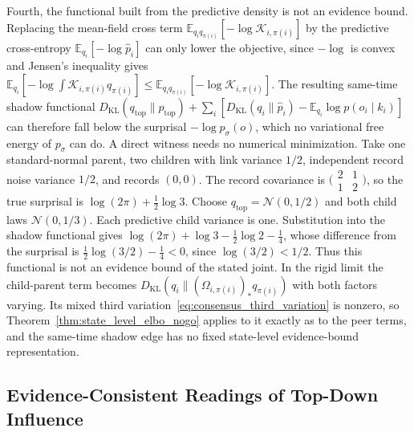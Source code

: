 \begin{remark}
Fourth, the functional built from the predictive density is not an evidence bound. Replacing the mean-field cross term $\mathbb{E}_{q_i q_{\pi(i)}}[-\log \mathcal{K}_{i,\pi(i)}]$ by the predictive cross-entropy $\mathbb{E}_{q_i}[-\log \hat{p}_i]$ can only lower the objective, since $-\log$ is convex and Jensen's inequality gives $\mathbb{E}_{q_i}[-\log \int \mathcal{K}_{i,\pi(i)} q_{\pi(i)}] \le \mathbb{E}_{q_i q_{\pi(i)}}[-\log \mathcal{K}_{i,\pi(i)}]$. The resulting same-time shadow functional $D_{\mathrm{KL}}(q_{\mathrm{top}}\|p_{\mathrm{top}}) + \sum_i [D_{\mathrm{KL}}(q_i\|\hat{p}_i) - \mathbb{E}_{q_i}\log p(o_i \mid k_i)]$ can therefore fall below the surprisal $-\log p_\sigma(o)$, which no variational free energy of $p_\sigma$ can do. A direct witness needs no numerical minimization. Take one standard-normal parent, two children with link variance $1/2$, independent record noise variance $1/2$, and records $(0,0)$. The record covariance is $\bigl(\begin{smallmatrix}2&1\\1&2\end{smallmatrix}\bigr)$, so the true surprisal is $\log(2\pi)+\tfrac12\log3$. Choose $q_{\mathrm{top}}=\mathcal N(0,1/2)$ and both child laws $\mathcal N(0,1/3)$. Each predictive child variance is one. Substitution into the shadow functional gives $\log(2\pi)+\log3-\tfrac12\log2-\tfrac14$, whose difference from the surprisal is $\tfrac12\log(3/2)-\tfrac14<0$, since $\log(3/2)<1/2$. Thus this functional is not an evidence bound of the stated joint. In the rigid limit the child-parent term becomes $D_{\mathrm{KL}}(q_i\|(\Omega_{i,\pi(i)})_* q_{\pi(i)})$ with both factors varying. Its mixed third variation~\eqref{eq:consensus_third_variation} is nonzero, so Theorem~\ref{thm:state_level_elbo_nogo} applies to it exactly as to the peer terms, and the same-time shadow edge has no fixed state-level evidence-bound representation.
\end{remark}

\subsection{Evidence-Consistent Readings of Top-Down Influence}

